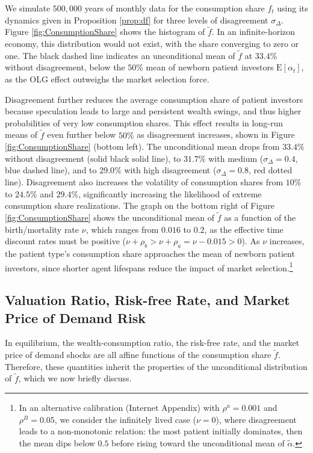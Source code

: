 \documentclass[preprint,11pt,authoryear]{elsarticle}
\theoremstyle{plain}
\begin{document}
We simulate $500,000$ years of monthly data for the consumption share $f_t$ using its dynamics given in Proposition \ref{prop:df} for three levels of disagreement $\sigma_{\Delta}$. Figure \ref{fig:ConsumptionShare} shows the histogram of $\tilde{f}$. In an infinite-horizon economy, this distribution would not exist, with the share converging to zero or one. The black dashed line indicates an unconditional mean of $\tilde{f}$ at $33.4\%$ without disagreement, below the $50\%$ mean of newborn patient investors $\mathrm{E}[ \alpha_t]$, as the OLG effect outweighs the market selection force.  
 
Disagreement further reduces the average consumption share of patient investors because speculation leads to large and persistent wealth swings, and thus higher probabilities of very low consumption shares. This effect results in long-run means of $\tilde{f}$ even further below $50\%$ as disagreement increases, shown in Figure \ref{fig:ConsumptionShare} (bottom left). The unconditional mean drops from $33.4\%$ without disagreement (solid black solid line), to $31.7\%$  with medium ($\sigma_{\Delta}= 0.4$, blue dashed line), and to $29.0\%$  with high disagreement ($\sigma_{\Delta}= 0.8$, red dotted line). Disagreement also increases the volatility of consumption shares from $10\%$ to $24.5\%$ and $29.4\%$, significantly increasing the likelihood of extreme consumption share realizations. The graph on the bottom right of Figure \ref{fig:ConsumptionShare} shows the unconditional mean of $\tilde{f}$ as a function of the birth/mortality rate $\nu$, which ranges from $0.016$ to $0.2$, as the effective time discount rates must be positive ($\nu+\rho_b > \nu+\rho_a = \nu-0.015>0$). As $\nu$ increases, the patient type's consumption share approaches the mean of newborn patient investors, since shorter agent lifespans reduce the impact of market selection.\footnote{In an alternative calibration (Internet Appendix) with $\rho^a = 0.001$ and $\rho^B = 0.05$, we consider the infinitely lived case ($\nu = 0$), where disagreement leads to a non-monotonic relation: the most patient initially dominates, then the mean dips below $0.5$ before rising toward the unconditional mean of $\tilde{\alpha}$.}


\subsection{Valuation Ratio, Risk-free Rate, and Market Price of Demand Risk}

In equilibrium, the wealth-consumption ratio, the risk-free rate, and the market price of demand shocks are all affine functions of the consumption share \( \tilde{f} \). Therefore, these quantities inherit the properties of the unconditional distribution of \( \tilde{f} \), which we now briefly discuss.
\end{document}
